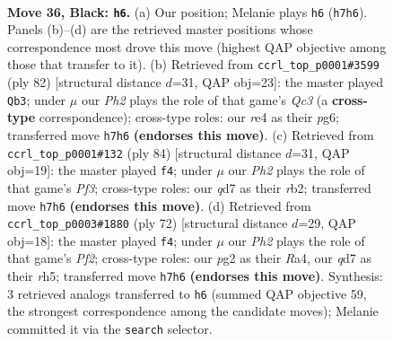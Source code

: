 \documentclass[11pt]{article}
\begin{document}
\clearpage

\begin{figure}[p]\centering
\begin{subfigure}{0.46\textwidth}\centering
\resizebox{\linewidth}{!}{%
\newchessgame
\chessboard[
  setfen={8/2pQ1p1p/5k2/8/4RP2/8/6P1/R5K1 b - - 0 36},
  showmover=false,
  pgfstyle=straightmove, color=movearrow, markmove={h7-h6}
]}
\caption{}
\end{subfigure}\hfill
\begin{subfigure}{0.46\textwidth}\centering
\resizebox{\linewidth}{!}{%
\newchessgame
\chessboard[
  setfen={6k1/5p2/6p1/8/7P/2Q2P2/P4K2/7q w - - 7 42},
  showmover=false,
  pgfstyle=straightmove, color=movearrow, markmove={c3-b3}
]}
\caption{}
\end{subfigure}
\\[4pt]
\begin{subfigure}{0.46\textwidth}\centering
\resizebox{\linewidth}{!}{%
\newchessgame
\chessboard[
  setfen={R7/6k1/5p2/1p3K1P/8/5P2/Pr6/8 w - - 3 43},
  showmover=false,
  pgfstyle=straightmove, color=movearrow, markmove={f3-f4}
]}
\caption{}
\end{subfigure}\hfill
\begin{subfigure}{0.46\textwidth}\centering
\resizebox{\linewidth}{!}{%
\newchessgame
\chessboard[
  setfen={8/6pk/8/3pP2r/R7/8/5P1P/5K2 w - - 0 37},
  showmover=false,
  pgfstyle=straightmove, color=movearrow, markmove={f2-f4}
]}
\caption{}
\end{subfigure}
\caption{\textbf{Move 36, Black: \texttt{h6}.} (a) Our position; Melanie plays \texttt{h6} (\texttt{h7h6}). Panels (b)--(d) are the retrieved master positions whose correspondence most drove this move (highest QAP objective among those that transfer to it). (b) Retrieved from \texttt{ccrl\_top\_p0001\#3599} (ply 82) [structural distance $d$=31, QAP obj=23]: the master played \texttt{Qb3}; under $\mu$ our \emph{Ph2} plays the role of that game's \emph{Qc3} (a \textbf{cross-type} correspondence); cross-type roles: our \emph{r}e4 as their \emph{p}g6; transferred move \texttt{h7h6} \textbf{(endorses this move)}. (c) Retrieved from \texttt{ccrl\_top\_p0001\#132} (ply 84) [structural distance $d$=31, QAP obj=19]: the master played \texttt{f4}; under $\mu$ our \emph{Ph2} plays the role of that game's \emph{Pf3}; cross-type roles: our \emph{q}d7 as their \emph{r}b2; transferred move \texttt{h7h6} \textbf{(endorses this move)}. (d) Retrieved from \texttt{ccrl\_top\_p0003\#1880} (ply 72) [structural distance $d$=29, QAP obj=18]: the master played \texttt{f4}; under $\mu$ our \emph{Ph2} plays the role of that game's \emph{Pf2}; cross-type roles: our \emph{p}g2 as their \emph{R}a4, our \emph{q}d7 as their \emph{r}h5; transferred move \texttt{h7h6} \textbf{(endorses this move)}. Synthesis: 3 retrieved analogs transferred to \texttt{h6} (summed QAP objective 59, the strongest correspondence among the candidate moves); Melanie committed it via the \texttt{search} selector.}
\label{fig:thought-m71}
\end{figure}
\end{document}
